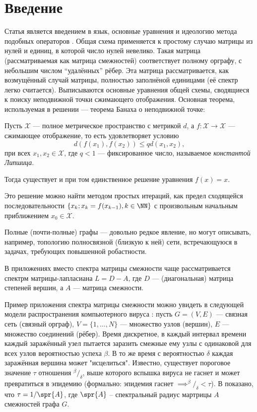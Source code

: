 \section{Введение}

Статья является введением в язык, основные уравнения и идеологию
метода подобных операторов \cite{baskakov-harmonic}.
Общая схема применяется к простому случаю матрицы из нулей и единиц,
в которой число нулей невелико.
Такая матрица (рассматриваемая как матрица смежностей)
соответствует полному орграфу, с небольшим числом ``удалённых'' рёбер.
Эта матрица рассматривается, как возмущённый случай матрицы,
полностью заполнёной единицами (её спектр легко считается).
Выписываются основные уравнения общей схемы,
сводящиеся к поиску неподвижной точки сжимающего отображения.
Основная теорема, используемая в решении
--- теорема Банаха о неподвижной точке:
\begin{thm}[Банаха]
Пусть \( \mathscr{X} \) --- полное метрическое пространство с метрикой \( d \),
а \( f: \mathscr{X}\to \mathscr{X} \) --- сжимающее отображение,
то есть удовлетворяет условию
\[ d(f(x_1), f(x_2)) \leq q d(x_1,x_2), \]
при всех \( x_1,x_2 \in \mathscr{X} \),
где \( q<1 \) --- фиксированное число, называемое \emph{константой Липшица}.

Тогда существует и при том единственное
решение уравнения \( f(x)=x \).

Это решение можно найти методом простых итераций,
как предел сходящейся последовательности \( \{ x_k; x_k = f(x_{k-1}), k\in\NN \} \)
с произвольным начальным приближением \( x_0 \in \mathscr{X} \).
\end{thm}

Полные (почти-полные) графы --- довольно редкое явление,
но могут описывать, например, топологию полносвязной (близкую к ней) сети,
встречающуюся в задачах, требующих повышенной робастности.

В приложениях вместо спектра матрицы смежности чаще рассматривается
спектрм матрицы-лапласиана \( L = D - A \),
где \( D \) --- (диагональная) матрица степеней вершин,
а \( A \) --- матрица смежности.

Пример приложения спектра матрицы смежности можно увидеть
в следующей модели распространения компьютерного вируса \cite{epidemic-eigenvalues}:
пусть \( G = (V, E) \) --- связная сеть (связный орграф),
\( V = \{1, \ldots, N\} \) --- множество узлов (вершин),
\( E \) --- множество соединений (рёбер).
Время дискретное, в каждый интервал времени каждый заражённый узел
пытается заразить смежные ему узлы с одинаковой для всех узлов вероятностью успеха \( \beta \).
В то же время с вероятностью \( \delta \) каждая заражённая вершина может "исцелиться".
Известно, существует пороговое значение \( \tau \) отношения \( {^\beta}/_{\delta} \),
выше которого вспышка вируса не гаснет и может превратиться в эпидемию
(формально: эпидемия гаснет \( \implies ^{\beta}/_{\delta} < \tau \)). 
В \cite{epidemic-eigenvalues} показано, что \( \tau = 1/\spr{A} \),
где \( \spr{A} \) -- спектральный радиус мартрицы \( A \) смежностей графа \( G \).
